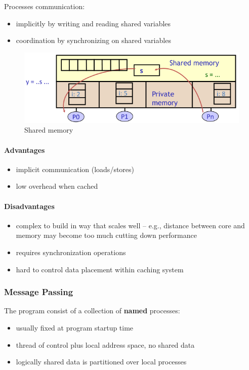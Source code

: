 Processes communication:
\begin{itemize}
    \item implicitly by writing and reading shared variables
    \item coordination by synchronizing on shared variables
\end{itemize}

\begin{figure}[h]
    \centering
    \includegraphics[width = \linewidth]{images/shared-memory-model}
    \caption{Shared memory}
    \label{fig:shared-memory-model}
\end{figure}

\paragraph{Advantages}
\begin{itemize}
    \item implicit communication (loads/stores)
    \item low overhead when cached
\end{itemize}

\paragraph{Disadvantages}
\begin{itemize}
    \item complex to build in way that scales well -- e.g., distance between core and memory may become too much
    cutting down performance
    \item requires synchronization operations
    \item hard to control data placement within caching system
\end{itemize}

\subsubsection{Message Passing}
The program consist of a collection of \textbf{named} processes:
\begin{itemize}
    \item usually fixed at program startup time
    \item thread of control plus local address space, no shared data
    \item logically shared data is partitioned over local processes
\end{itemize}

